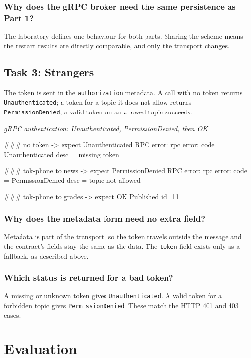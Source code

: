 \documentclass[12pt,a4paper]{article}
\begin{document}
\subsubsection{Why does the gRPC broker need the same persistence as Part 1?}
The laboratory defines one behaviour for both parts. Sharing the scheme means the
restart results are directly comparable, and only the transport changes.

\subsection{Task 3: Strangers}
The token is sent in the \texttt{authorization} metadata. A call with no token
returns \texttt{Unauthenticated}; a token for a topic it does not allow returns
\texttt{PermissionDenied}; a valid token on an allowed topic succeeds:

\par\medskip\noindent\textit{gRPC authentication: Unauthenticated, PermissionDenied, then OK.}\par\nopagebreak
\begin{terminalwindow}[]
### no token -> expect Unauthenticated
RPC error: rpc error: code = Unauthenticated desc = missing token

### tok-phone to news -> expect PermissionDenied
RPC error: rpc error: code = PermissionDenied desc = topic not allowed

### tok-phone to grades -> expect OK
Published id=11
\end{terminalwindow}

\subsubsection{Why does the metadata form need no extra field?}
Metadata is part of the transport, so the token travels outside the message and
the contract's fields stay the same as the data. The \texttt{token} field exists
only as a fallback, as described above.

\subsubsection{Which status is returned for a bad token?}
A missing or unknown token gives \texttt{Unauthenticated}. A valid token for a
forbidden topic gives \texttt{PermissionDenied}. These match the HTTP 401 and 403
cases.

\section{Evaluation}
\end{document}
